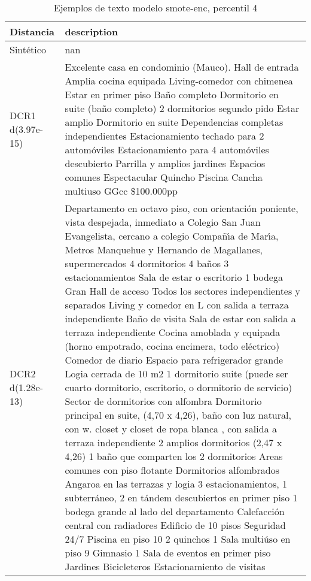 \begin{table}[H]
\centering
\fontsize{10}{14}\selectfont
\caption{Ejemplos de texto modelo smote-enc, percentil 4}
\label{table-example-economicos-b-2-smote-enc-4p-text}
\begin{tabular}{|l|m{35em}|}
\hline
\rowcolor[gray]{0.8}
Distancia & description \\
\hline Sintético & nan \\
\hline DCR1 d(3.97e-15) & Excelente casa en condominio (Mauco).
Hall de entrada
Amplia cocina  equipada
Living-comedor con chimenea
Estar en primer piso
Ba\~no completo
Dormitorio en suite (ba\~no completo)
2 dormitorios
segundo pido
Estar amplio
Dormitorio en suite
Dependencias completas independientes
Estacionamiento techado para 2 autom\'oviles
Estacionamiento para 4 autom\'oviles descubierto
Parrilla y amplios jardines
Espacios comunes
Espectacular Quincho
Piscina
Cancha multiuso
GGcc \$100.000pp \\
\hline DCR2 d(1.28e-13) & Departamento en octavo piso, con orientaci\'on poniente, vista despejada, inmediato a Colegio San Juan Evangelista, cercano a colegio Compa\~n{\'\i}a de Mar{\'\i}a, Metros Manquehue y Hernando de Magallanes, supermercados  4 dormitorios 4 ba\~nos 3 estacionamientos Sala de estar o escritorio 1 bodega  Gran Hall de acceso Todos los sectores independientes y separados Living y comedor en L con salida a terraza independiente Ba\~no de visita Sala de estar con salida a terraza independiente  Cocina amoblada y equipada (horno empotrado, cocina encimera, todo el\'ectrico) Comedor de diario Espacio para refrigerador grande Logia cerrada de 10 m2 1 dormitorio suite (puede ser cuarto dormitorio, escritorio, o dormitorio de servicio)  Sector de dormitorios con alfombra Dormitorio principal en suite, (4,70 x 4,26), ba\~no con luz natural, con w. closet y closet de ropa blanca , con salida a terraza independiente 2 amplios dormitorios (2,47 x 4,26) 1 ba\~no que comparten los 2 dormitorios  Areas comunes con piso flotante Dormitorios alfombrados Angaroa en las terrazas y logia  3 estacionamientos, 1 subterr\'aneo, 2 en t\'andem descubiertos en primer piso 1 bodega grande al lado del departamento Calefacci\'on central con radiadores  Edificio de 10 pisos Seguridad 24/7 Piscina en piso 10 2 quinchos 1 Sala multi\'uso en piso 9 Gimnasio 1 Sala de eventos en primer piso Jardines Bicicleteros Estacionamiento de visitas \\
\hline
\end{tabular}
\end{table}
